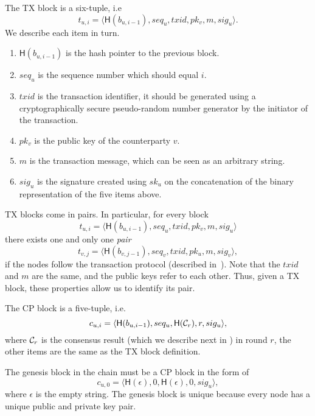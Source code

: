 \begin{definition}
The TX block is a six-tuple, i.e
$$t_{u, i} = \langle \textsf{H}(b_{u, i - 1}), seq_u, txid, pk_v, m, sig_u \rangle.$$
We describe each item in turn.
\begin{enumerate}
\item $\textsf{H}(b_{u, i - 1})$ is the hash pointer to the previous block.
\item $seq_u$ is the sequence number which should equal $i$.
\item $txid$ is the transaction identifier, it should be generated using a cryptographically secure pseudo-random number generator by the initiator of the transaction.
\item $pk_v$ is the public key of the counterparty $v$.
\item $m$ is the transaction message,
    which can be seen as an arbitrary string.
\item $sig_u$ is the signature created using $sk_u$ on the concatenation of the binary representation of the five items above.
\end{enumerate}

TX blocks come in pairs.
In particular, for every block 
$$t_{u, i} = \langle \textsf{H}(b_{u, i - 1}), seq_u, txid, pk_v, m, sig_u \rangle$$
there exists one and only one \emph{pair} 
$$t_{v, j} = \langle \textsf{H}(b_{v, j - 1}), seq_v, txid, pk_u, m, sig_v \rangle,$$
if the nodes follow the transaction protocol (described in~).
Note that the $txid$ and $m$ are the same, and the public keys refer to each other.
Thus, given a TX block, these properties allow us to identify its pair.
\end{definition}


\begin{definition}
The CP block is a five-tuple, i.e. 
$$c_{u, i} = \langle \textsf{H}(b_{u, i-1}), seq_u, \textsf{H}(\mathcal{C}_r), r, sig_u \rangle,$$
where $\mathcal{C}_r$ is the consensus result (which we describe next in ) in round $r$,
the other items are the same as the TX block definition.

The genesis block in the chain must be a CP block in the form of
$$c_{u, 0} = \langle \textsf{H}(\epsilon), 0,  \textsf{H}(\epsilon), 0, sig_u \rangle,$$
where $\epsilon$ is the empty string.
The genesis block is unique because every node has a unique public and private key pair.
\end{definition}

